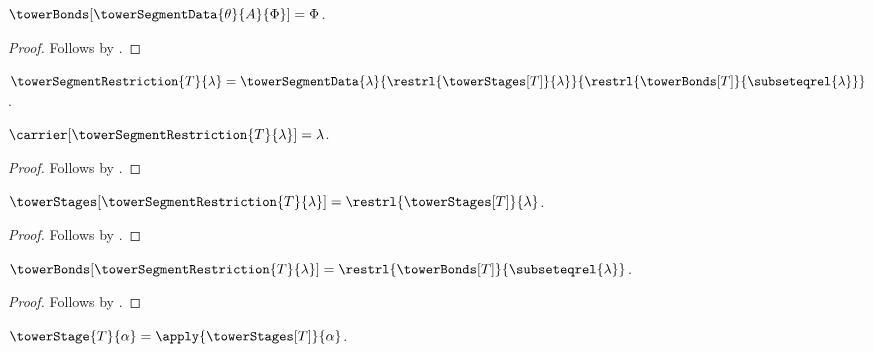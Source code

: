 \begin{proposition}\label{tower_segment_data_structure_bonds}
    $\towerBonds[\towerSegmentData{\theta}{A}{\Phi}]=\Phi$.
\end{proposition}
\begin{proof}
    Follows by
        .
\end{proof}

\begin{definition}\label{tower_segment_restriction}
    $\towerSegmentRestriction{T}{\lambda}=
        \towerSegmentData{\lambda}
            {\restrl{\towerStages[T]}{\lambda}}
            {\restrl{\towerBonds[T]}{\subseteqrel{\lambda}}}$.
\end{definition}

\begin{proposition}\label{tower_segment_restriction_carrier}
    $\carrier[\towerSegmentRestriction{T}{\lambda}]=\lambda$.
\end{proposition}
\begin{proof}
    Follows by
        .
\end{proof}

\begin{proposition}\label{tower_segment_restriction_stages}
    $\towerStages[\towerSegmentRestriction{T}{\lambda}]=
        \restrl{\towerStages[T]}{\lambda}$.
\end{proposition}
\begin{proof}
    Follows by
        .
\end{proof}

\begin{proposition}\label{tower_segment_restriction_bonds}
    $\towerBonds[\towerSegmentRestriction{T}{\lambda}]=
        \restrl{\towerBonds[T]}{\subseteqrel{\lambda}}$.
\end{proposition}
\begin{proof}
    Follows by
        .
\end{proof}

\begin{definition}\label{tower_stage}
    $\towerStage{T}{\alpha}=\apply{\towerStages[T]}{\alpha}$.
\end{definition}

